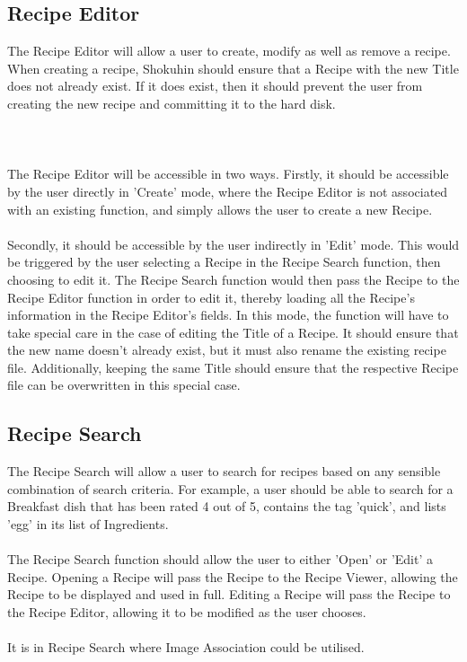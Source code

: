\documentclass[a4paper, 12pt]{article}
\begin{document}
\subsection{Recipe Editor}
The Recipe Editor will allow a user to create, modify as well as remove a recipe. When creating a recipe, Shokuhin should ensure that a Recipe with the new Title does not already exist. If it does exist, then it should prevent the user from creating the new recipe and committing it to the hard disk.\\\\
\\\\The Recipe Editor will be accessible in two ways. Firstly, it should be accessible by the user directly in 'Create' mode, where the Recipe Editor is not associated with an existing function, and simply allows the user to create a new Recipe.\\\\
Secondly, it should be accessible by the user indirectly in 'Edit' mode. This would be triggered by the user selecting a Recipe in the Recipe Search function, then choosing to edit it. The Recipe Search function would then pass the Recipe to the Recipe Editor function in order to edit it, thereby loading all the Recipe's information in the Recipe Editor's fields. In this mode, the function will have to take special care in the case of editing the Title of a Recipe. It should ensure that the new name doesn't already exist, but it must also rename the existing recipe file. Additionally, keeping the same Title should ensure that the respective Recipe file can be overwritten in this special case.

\newpage
\subsection{Recipe Search}
The Recipe Search will allow a user to search for recipes based on any sensible combination of search criteria. For example, a user should be able to search for a Breakfast dish that has been rated 4 out of 5, contains the tag 'quick', and lists 'egg' in its list of Ingredients.\\\\
The Recipe Search function should allow the user to either 'Open' or 'Edit' a Recipe. Opening a Recipe will pass the Recipe to the Recipe Viewer, allowing the Recipe to be displayed and used in full. Editing a Recipe will pass the Recipe to the Recipe Editor, allowing it to be modified as the user chooses.\\\\
It is in Recipe Search where Image Association could be utilised.
\end{document}
